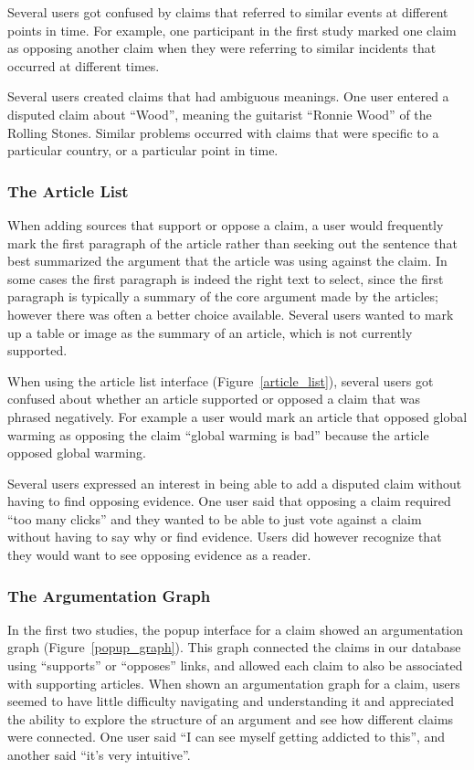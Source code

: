 \documentclass{www2010-submission}
\begin{document}
Several users got confused by claims that referred to similar events at different points in time. For example, one participant in the first study marked one claim as opposing another claim when they were referring to similar incidents that occurred at different times. 

Several users created claims that had ambiguous meanings. One user entered a disputed claim about ``Wood'', meaning the guitarist ``Ronnie Wood'' of the Rolling Stones. Similar problems occurred with claims that were specific to a particular country, or a particular point in time. 


\subsubsection{The Article List}

When adding sources that support or oppose a claim, a user would frequently mark the first paragraph of the article rather than seeking out the sentence that best summarized the argument that the article was using against the claim. In some cases the first paragraph is indeed the right text to select, since the first paragraph is typically a summary of the core argument made by the articles; however there was often a better choice available. Several users wanted to mark up a table or image as the summary of an article, which is not currently supported.

When using the article list interface (Figure~\ref{article_list}), several users got confused about whether an article supported or opposed a claim that was phrased negatively. For example a user would mark an article that opposed global warming as opposing the claim ``global warming is bad'' because the article opposed global warming.

Several users expressed an interest in being able to add a disputed claim without having to find opposing evidence. One user said that opposing a claim required ``too many clicks'' and they wanted to be able to just vote against a claim without having to say why or find evidence. Users did however recognize that they would want to see opposing evidence as a reader.

\subsubsection{The Argumentation Graph}

In the first two studies, the popup interface for a claim showed an argumentation graph (Figure~\ref{popup_graph}). This graph connected the claims in our database using ``supports'' or ``opposes'' links, and allowed each claim to also be associated with supporting articles. When shown an argumentation graph for a claim, users seemed to have little difficulty navigating and understanding it and appreciated the ability to explore the structure of an argument and see how different claims were connected. One user said ``I can see myself getting addicted to this'', and another said ``it's very intuitive''.
\end{document}
